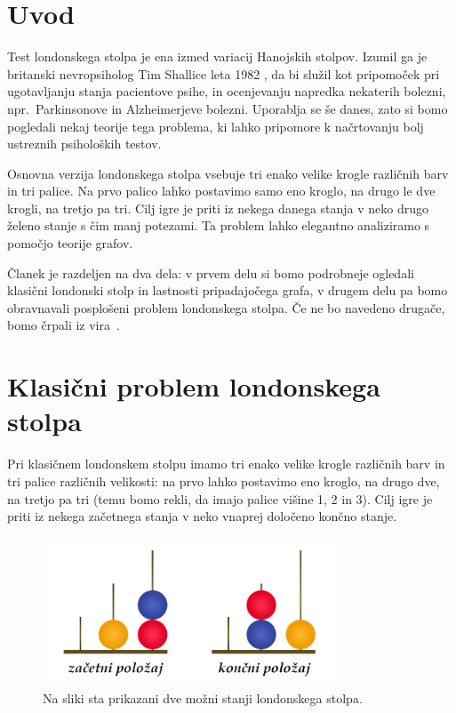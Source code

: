 \documentclass[twoside,11pt]{article}
\begin{document}
\glava\baselineskip=14.5pt

\smallskip

\section{Uvod}

Test londonskega stolpa je ena izmed variacij Hanojskih stolpov. Izumil ga je britanski nevropsiholog Tim Shallice leta 1982 \cite{bib:wikishal}, da bi služil kot pripomoček pri ugotavljanju stanja pacientove psihe, in ocenjevanju napredka nekaterih bolezni, npr.\ Parkinsonove in Alzheimerjeve bolezni.  Uporablja se še danes, zato si bomo pogledali nekaj teorije tega problema, ki lahko pripomore k načrtovanju bolj ustreznih psiholoških testov. 

Osnovna verzija londonskega stolpa vsebuje tri enako velike krogle različnih barv in tri palice. Na prvo palico lahko postavimo samo eno kroglo, na drugo le dve krogli, na tretjo pa tri. Cilj igre je priti iz nekega danega stanja v neko drugo želeno stanje s čim manj potezami. Ta problem lahko elegantno analiziramo s pomočjo teorije grafov.

Članek je razdeljen na dva dela: v prvem delu si bomo podrobneje ogledali klasični londonski stolp in lastnosti pripadajočega grafa, v drugem delu pa bomo obravnavali posplošeni problem londonskega stolpa. Če ne bo navedeno drugače, bomo črpali iz vira~\cite{bib:tohmyths}.

\section{Klasični problem londonskega stolpa}
Pri klasičnem londonskem stolpu imamo tri enako velike krogle različnih barv in tri palice različnih velikosti: na prvo lahko postavimo eno kroglo, na drugo dve, na tretjo pa tri (temu bomo rekli, da imajo palice višine 1, 2 in 3). Cilj igre je priti iz nekega začetnega stanja v neko vnaprej določeno končno stanje.

\begin{figure}[h]
    \centering
    \includegraphics[width=250pt]{img/london-tower.png}
    \caption{Na sliki sta prikazani dve možni stanji londonskega stolpa.}
    \label{fig:stanji}
\end{figure}
\end{document}
